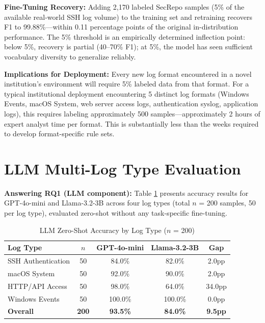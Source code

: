 \documentclass[12pt,oneside]{report}
\begin{document}
\textbf{Fine-Tuning Recovery:} Adding 2,170 labeled SecRepo samples (5\% of the available real-world SSH log volume) to the training set and retraining recovers F1 to 99.88\%—within 0.11 percentage points of the original in-distribution performance. The 5\% threshold is an empirically determined inflection point: below 5\%, recovery is partial (40--70\% F1); at 5\%, the model has seen sufficient vocabulary diversity to generalize reliably.

\textbf{Implications for Deployment:} Every new log format encountered in a novel institution's environment will require 5\% labeled data from that format. For a typical institutional deployment encountering 5 distinct log formats (Windows Events, macOS System, web server access logs, authentication syslog, application logs), this requires labeling approximately 500 samples—approximately 2 hours of expert analyst time per format. This is substantially less than the weeks required to develop format-specific rule sets.

\section{LLM Multi-Log Type Evaluation}

\textbf{Answering RQ1 (LLM component):} Table \ref{tab:llm_multilog} presents accuracy results for GPT-4o-mini and Llama-3.2-3B across four log types (total $n$ = 200 samples, 50 per log type), evaluated zero-shot without any task-specific fine-tuning.

\begin{table}[H]
\centering
\caption{LLM Zero-Shot Accuracy by Log Type ($n$ = 200)}
\label{tab:llm_multilog}
\renewcommand{\arraystretch}{1.3}
\begin{tabular}{|l|c|c|c|c|}
\hline
\textbf{Log Type} & \textbf{$n$} & \textbf{GPT-4o-mini} & \textbf{Llama-3.2-3B} & \textbf{Gap} \\
\hline
SSH Authentication & 50 & 84.0\% & 82.0\% & 2.0pp \\
macOS System & 50 & 92.0\% & 90.0\% & 2.0pp \\
HTTP/API Access & 50 & 98.0\% & 64.0\% & 34.0pp \\
Windows Events & 50 & 100.0\% & 100.0\% & 0.0pp \\
\hline
\textbf{Overall} & \textbf{200} & \textbf{93.5\%} & \textbf{84.0\%} & \textbf{9.5pp} \\
\hline
\end{tabular}
\end{table}
\end{document}
